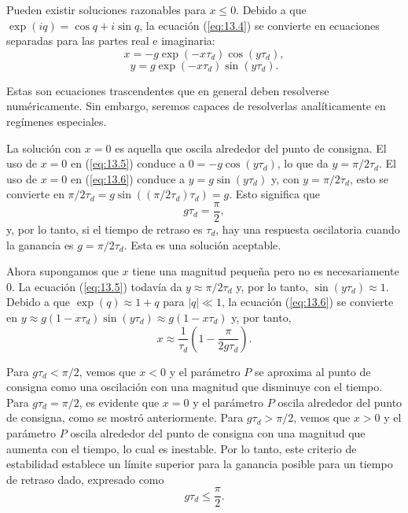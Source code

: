 \documentclass[12pt]{book}
\begin{document}
Pueden existir soluciones razonables para $x \le 0$. Debido a que $\exp(iq) = \cos q + i\sin q$, la ecuación (\ref{eq:13.4}) se convierte en ecuaciones separadas para las partes real e imaginaria:
\begin{equation}
  x = -g \exp(-x\tau_d) \cos(y\tau_d), \label{eq:13.5}
\end{equation}
\begin{equation}
  y = g \exp(-x\tau_d) \sin(y\tau_d). \label{eq:13.6}
\end{equation}

Estas son ecuaciones trascendentes que en general deben resolverse numéricamente. Sin embargo, seremos capaces de resolverlas analíticamente en regímenes especiales.

La solución con $x = 0$ es aquella que oscila alrededor del punto de consigna. El uso de $x = 0$ en (\ref{eq:13.5}) conduce a $0 = -g \cos(y\tau_d)$, lo que da $y = \pi/2\tau_d$. El uso de $x = 0$ en (\ref{eq:13.6}) conduce a $y = g \sin(y\tau_d)$ y, con $y = \pi/2\tau_d$, esto se convierte en $\pi/2\tau_d = g \sin((\pi/2\tau_d)\tau_d) = g$. Esto significa que
\begin{equation}
  g\tau_d = \frac{\pi}{2}, \label{eq:13.7}
\end{equation}
y, por lo tanto, si el tiempo de retraso es $\tau_d$, hay una respuesta oscilatoria cuando la ganancia es $g = \pi/2\tau_d$. Esta es una solución aceptable.

Ahora supongamos que $x$ tiene una magnitud pequeña pero no es necesariamente 0. La ecuación (\ref{eq:13.5}) todavía da $y \approx \pi/2\tau_d$ y, por lo tanto, $\sin(y\tau_d) \approx 1$. Debido a que $\exp(q) \approx 1 + q$ para $|q| \ll 1$, la ecuación (\ref{eq:13.6}) se convierte en $y \approx g(1 - x\tau_d)\sin(y\tau_d) \approx g(1 - x\tau_d)$ y, por tanto,
\begin{equation}
  x \approx \frac{1}{\tau_d} \left( 1 - \frac{\pi}{2g\tau_d} \right). \label{eq:13.8}
\end{equation}

Para $g\tau_d < \pi/2$, vemos que $x < 0$ y el parámetro $P$ se aproxima al punto de consigna como una oscilación con una magnitud que disminuye con el tiempo. Para $g\tau_d = \pi/2$, es evidente que $x = 0$ y el parámetro $P$ oscila alrededor del punto de consigna, como se mostró anteriormente. Para $g\tau_d > \pi/2$, vemos que $x > 0$ y el parámetro $P$ oscila alrededor del punto de consigna con una magnitud que aumenta con el tiempo, lo cual es inestable. Por lo tanto, este criterio de estabilidad establece un límite superior para la ganancia posible para un tiempo de retraso dado, expresado como
\begin{equation}
  g\tau_d \le \frac{\pi}{2}. \label{eq:13.9}
\end{equation}
\end{document}
